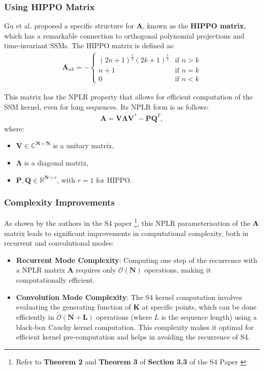 \documentclass[12pt,a4paper]{report}
\begin{document}
\subsubsection{Using HIPPO Matrix}
Gu et al. \cite{hippo,s4} proposed a specific structure for $\mathbf{A}$, known as the \textbf{HIPPO matrix}, which has a remarkable connection to orthogonal polynomial projections and time-invariant SSMs. The HIPPO matrix is defined as:
\[
\begin{aligned}
\mathbf{A}_{nk} =
-\begin{cases}
(2n + 1)^{\frac{1}{2}}(2k + 1)^{\frac{1}{2}} & \text{if } n > k \\
n + 1 & \text{if } n = k \\
0 & \text{if } n < k
\end{cases}
\end{aligned}
\]

This matrix has the NPLR property that allows for efficient computation of the SSM kernel, even for long sequences. Its NPLR form is as follows:
\[
\begin{aligned}
\mathbf{A} = \mathbf{V}\mathbf{\Lambda}\mathbf{V}^* - \mathbf{P}\mathbf{Q}^T,
\end{aligned}
\]
where:
\begin{itemize}
    \item $\mathbf{V} \in \mathbb{C}^{\mathbf{N} \times \mathbf{N}}$ is a unitary matrix,
    \item $\mathbf{\Lambda}$ is a diagonal matrix,
    \item $\mathbf{P}, \mathbf{Q} \in \mathbb{R}^{\mathbf{N} \times r}$, with $r=1$ for HIPPO.
\end{itemize}

\subsubsection{Complexity Improvements}
As shown by the authors in the S4 paper \footnote{Refer to \textbf{Theorem 2} and \textbf{Theorem 3} of \textbf{Section 3.3} of the S4 Paper \cite{s4}}, this NPLR parameterisation of the $\mathbf{A}$ matrix leads to significant improvements in computational complexity, both in recurrent and convolutional modes:
\begin{itemize}
    \item \textbf{Recurrent Mode Complexity}: Computing one step of the recurrence with a NPLR matrix $\mathbf{A}$ requires only $\mathbf{\mathcal{O}(N)}$ operations, making it computationally efficient.
    \item \textbf{Convolution Mode Complexity}: The S4 kernel computation involves evaluating the generating function of $\mathbf{K}$ at specific points, which can be done efficiently in $\mathbf{\tilde{\mathcal{O}}(N+L)}$ operations (where $L$ is the sequence length) using a black-box Cauchy kernel computation. This complexity makes it optimal for efficient kernel pre-computation and helps in avoiding the recurrence of S4.
\end{itemize}
\end{document}
